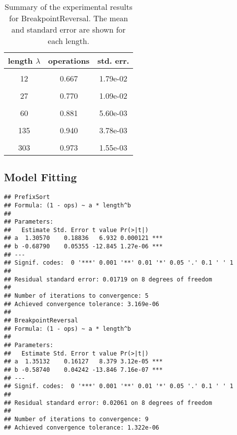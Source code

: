 \documentclass[
  11pt,
  a4paper,
]{article}
\begin{document}
\begin{longtable}[t]{c|c|c}
\caption{\label{tab:data-summary}Summary of the experimental results for BreakpointReversal. The mean and standard error are shown for each length.\label{tab:BreakpointReversal}}\\
\hline
\textbf{length $\lambda$} & \textbf{operations} & \textbf{std. err.}\\
\hline
\cellcolor{gray!10}{8} & \cellcolor{gray!10}{0.625} & \cellcolor{gray!10}{2.08e-02}\\
12 & 0.667 & 1.79e-02\\
\cellcolor{gray!10}{18} & \cellcolor{gray!10}{0.757} & \cellcolor{gray!10}{1.42e-02}\\
27 & 0.770 & 1.09e-02\\
\cellcolor{gray!10}{40} & \cellcolor{gray!10}{0.832} & \cellcolor{gray!10}{9.45e-03}\\
60 & 0.881 & 5.60e-03\\
\cellcolor{gray!10}{90} & \cellcolor{gray!10}{0.911} & \cellcolor{gray!10}{5.37e-03}\\
135 & 0.940 & 3.78e-03\\
\cellcolor{gray!10}{202} & \cellcolor{gray!10}{0.959} & \cellcolor{gray!10}{2.64e-03}\\
303 & 0.973 & 1.55e-03\\
\hline
\end{longtable}

\subsection{Model Fitting}\label{model-fitting}

\begin{verbatim}
## PrefixSort
## Formula: (1 - ops) ~ a * length^b
## 
## Parameters:
##   Estimate Std. Error t value Pr(>|t|)    
## a  1.30570    0.18836   6.932 0.000121 ***
## b -0.68790    0.05355 -12.845 1.27e-06 ***
## ---
## Signif. codes:  0 '***' 0.001 '**' 0.01 '*' 0.05 '.' 0.1 ' ' 1
## 
## Residual standard error: 0.01719 on 8 degrees of freedom
## 
## Number of iterations to convergence: 5 
## Achieved convergence tolerance: 3.169e-06
## 
## BreakpointReversal
## Formula: (1 - ops) ~ a * length^b
## 
## Parameters:
##   Estimate Std. Error t value Pr(>|t|)    
## a  1.35132    0.16127   8.379 3.12e-05 ***
## b -0.58740    0.04242 -13.846 7.16e-07 ***
## ---
## Signif. codes:  0 '***' 0.001 '**' 0.01 '*' 0.05 '.' 0.1 ' ' 1
## 
## Residual standard error: 0.02061 on 8 degrees of freedom
## 
## Number of iterations to convergence: 9 
## Achieved convergence tolerance: 1.322e-06
\end{verbatim}
\end{document}
